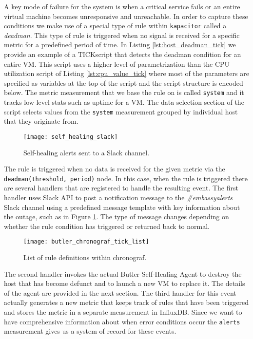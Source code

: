 A key mode of failure for the system is when a critical service fails or an entire virtual machine becomes unresponsive and unreachable. In order to capture these conditions we make use of a special type of rule within \texttt{kapacitor} called a \emph{deadman}. This type of rule is triggered when no signal is received for a specific metric for a predefined period of time. In Listing \ref{lst:host_deadman_tick} we provide an example of a TICKscript that detects the deadman condition for an entire VM. This script uses a higher level of parametrization than the CPU utilization script of Listing \ref{lst:cpu_value_tick} where most of the parameters are specified as variables at the top of the script and the script structure is encoded below. The metric measurement that we base the rule on is called \texttt{system} and it tracks low-level stats such as uptime for a VM. The data selection section of the script selects values from the \texttt{system} measurement grouped by individual host that they originate from.

\begin{figure}[h]
  \texttt{[image: self\_healing\_slack]}
  \centering
  \caption {Self-healing alerts sent to a Slack channel.}
  \label{fig:self_healing_slack}
\end{figure} 

The rule is triggered when no data is received for the given metric via the \texttt{deadman(threshold, period)} node. In this case, when the rule is triggered there are several handlers that are registered to handle the resulting event. The first handler uses Slack API\autocite{slack} to post a notification message to the \emph{\#embassyalerts} Slack channel using a predefined message template with key information about the outage, such as in Figure \ref{fig:self_healing_slack}. The type of message changes depending on whether the rule condition has triggered or returned back to normal.

\begin{figure}[h]
  \texttt{[image: butler\_chronograf\_tick\_list]}
  \centering
  \caption {List of rule definitions within chronograf.}
  \label{fig:butler_chronograf_tick_list}
\end{figure} 

The second handler invokes the actual Butler Self-Healing Agent to destroy the host that has become defunct and to launch a new VM to replace it. The details of the agent are provided in the next section. The third handler for this event actually generates a new metric that keeps track of rules that have been triggered and stores the metric in a separate measurement in InfluxDB. Since we want to have comprehensive information about when error conditions occur the \texttt{alerts} measurement gives us a system of record for these events.

